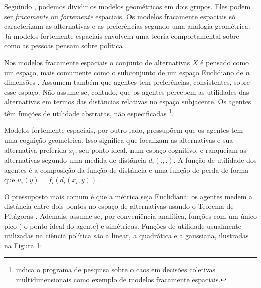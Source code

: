 Seguindo , podemos dividir os modelos
geométricos em dois grupos. Eles podem ser \textit{fracamente} ou
\textit{fortemente} espaciais. Os modelos fracamente espaciais só caracterizam
as alternativas e as preferências segundo uma analogia geométrica. Já modelos
fortemente espaciais envolvem uma teoria comportamental sobre como as pessoas
pensam sobre política \cite{laver2014measuring}.


Nos modelos fracamente espaciais o conjunto de alternativas \(X\) é pensado como
um espaço, mais comumente como o subconjunto de um espaço Euclidiano de \(n\)
dimensões \cite{austen1998social}. Assumem também que agentes tem preferências,
consistentes, sobre esse espaço. Não assume-se, contudo, que os agentes percebem
as utilidades das alternativas em termos das distâncias relativas no espaço
subjacente. Os agentes têm funções de utilidade abstratas, não especificadas
\cite{humphreys2010spatial}\footnote{ indica o
  programa de pesquisa sobre o caos em decisões coletivas multidimensionais
  como exemplo de modelos fracamente espaciais.}.

Modelos fortemente espaciais, por outro lado, pressupõem que os agentes tem uma
cognição geométrica. Isso significa que localizam as alternativas e sua
alternativa preferida \(x_i\), seu ponto ideal, num espaço cognitivo, e
ranqueiam as alternativas segundo uma medida de distância \(d_i(.,.)\). A função
de utilidade dos agentes é a composição da função de distância e uma função de
perda de forma que \(u_i(y) = f_i(d_i(x_i,y)) \) \cite{humphreys2010spatial,
  laver2014measuring}.

O pressuposto mais comum é que a métrica seja Euclidiana: os agentes medem a
distância entre dois pontos no espaço de alternativas usando o Teorema de
Pitágoras \cite{munger2015choosing}. Ademais, assume-se, por conveniência
analítica, funções com um único pico ( o ponto ideal do agente) e simétricas.
Funções de utilidade usualmente utilizadas na ciência política são a linear, a
quadrática e a gaussiana, ilustradas na Figura 1:

